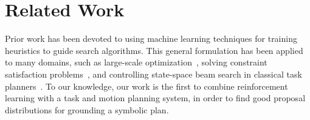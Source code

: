 \section{Related Work}
Prior work has been devoted to using machine learning techniques for
training heuristics to guide search algorithms. This general formulation
has been applied to many domains, such as large-scale optimization~\cite{Boyanlearning},
solving constraint satisfaction problems~\cite{hamadisearch}, and controlling state-space beam
search in classical task planners~\cite{Xu07discriminativelearning}. To our knowledge, our work is the
first to combine reinforcement learning with a task and motion planning
system, in order to find good proposal distributions for grounding a symbolic
plan.
